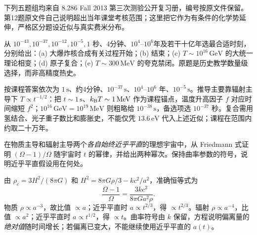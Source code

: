 下列五题组均来自 8.286 Fall 2013 第三次测验公开复习册，编号按原文件保留。第12题原文件自己说明超出当年课堂考核范围；这里把它作为有条件的化学势延伸，严格区分题设近似与真实费米分布。

\begin{exercise}
从 $10^{-43},10^{-37},10^{-12},10^{-5},1$ 秒、4分钟、$10^4$--$10^6$年及若干十亿年选最合适时刻，分别给出：(a) 大爆炸核合成有关过程开始；(b) 结束；(c) $T\sim10^{16}\,\mathrm{GeV}$ 的大统一理论相变；(d) 原子复合；(e) $T\sim300\,\mathrm{MeV}$ 的夸克禁闭。原题是历史教学数量级选择，而非高精度热史。
\end{exercise}
\begin{solution}
按课程答案依次为 $1\,\mathrm s$、约4分钟、$10^{-37}\,\mathrm s$、$10^4$--$10^6$ 年、$10^{-5}\,\mathrm s$。推导主要靠辐射主导下 $T\propto t^{-1/2}$：把 $t\sim1\,\mathrm s$、$k_{\mathrm B} T\sim1\,\mathrm{MeV}$ 作为课程锚点，温度升高因子 $f$ 对应时间缩短 $f^2$；$10^{16}\,\mathrm{GeV}=10^{19}\,\mathrm{MeV}$ 则粗略给 $10^{-38}\,\mathrm s$，备选项选 $10^{-37}$ 秒。复合需用氢结合、光子重子数比和膨胀史，不能仅凭 $13.6\,\mathrm{eV}$ 代入上述近似；课程在范围内约取二十万年。
\end{solution}

\begin{exercise}
在物质主导和辐射主导两个\emph{各自始终近乎平直}的理想宇宙中，从 Friedmann 式证明 $(\Omega-1)/\Omega$ 随宇宙时 $t$ 的幂律，并给出两种幂次。保持曲率参数的符号，说明近乎平直假设用在何处。
\end{exercise}
\begin{solution}
由 $\rho_c=3H^2/(8\pi G)$ 和 $H^2=8\pi G\rho/3-kc^2/a^2$，准确恒等式为
\[
\frac{\Omega-1}{\Omega}=\frac{3kc^2}{8\pi Ga^2\rho}.
\]
物质 $\rho\propto a^{-3}$，故比值 $\propto a$；近乎平直时 $a\propto t^{2/3}$，得 $\propto t^{2/3}$。辐射 $\rho\propto a^{-4}$，比值 $\propto a^2$；近乎平直时 $a\propto t^{1/2}$，得 $\propto t$。曲率符号由 $k$ 保留，方程说明偏离量的\emph{绝对值}随时间增长；若偏离已变大，不能继续使用近乎平直的 $a(t)$。
\end{solution}

